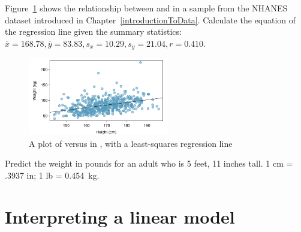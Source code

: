 
\begin{exercisewrap}
\begin{nexercise}
Figure~\ref{nhanesHeightWeightRegress} shows the relationship between  and  in a sample from the NHANES dataset introduced in Chapter~\ref{introductionToData}. Calculate the equation of the regression line given the summary statistics: $\overline{x} = 168.78, \overline{y} = 83.83, s_{x} = 10.29, s_{y} = 21.04, r = 0.410$.\footnotemark{}
\end{nexercise}
\end{exercisewrap}

\begin{figure}[h]
	\centering
	\includegraphics[width=0.55\textwidth]
	{ch_09a_simple_linear_regression_oi_biostat/figures/nhanesHeightWeightRegress/nhanesHeightWeightRegress}
	\caption{A plot of  versus  in , with a least-squares regression line}
	\label{nhanesHeightWeightRegress}
\end{figure}

\begin{exercisewrap}
\begin{nexercise}\label{predictingNHANESWeightfrmHeightMetric}%
Predict the weight in pounds for an adult who is 5 feet, 11 inches tall. 1 cm = .3937 in; 1 lb = 0.454~kg.\footnotemark{}
\end{nexercise}
\end{exercisewrap}



\section{Interpreting a linear model}
\label{interpretingLeastSquaresLine}

